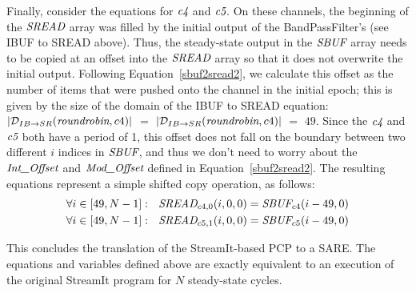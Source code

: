 Finally, consider the equations for $\mbox{\it c4}$ and $\mbox{\it c5}$.  On these
channels, the beginning of the $\mbox{\it SREAD}$ array was filled by the
initial output of the BandPassFilter's (see IBUF to SREAD above).
Thus, the steady-state output in the $\mbox{\it SBUF}$ array needs to be
copied at an offset into the $\mbox{\it SREAD}$ array so that it does not
overwrite the initial output.  Following Equation~\ref{sbuf2sread2},
we calculate this offset as the number of items that were pushed onto
the channel in the initial epoch; this is given by the size of the
domain of the IBUF to SREAD equation: $|{\cal D}_{IB \rightarrow
SR}(\mbox{\it roundrobin}, c4)|$ $=$ $|{\cal D}_{IB \rightarrow
SR}(\mbox{\it roundrobin}, c4)|$ $=$ $49$.  Since the $\mbox{\it c4}$ and
$\mbox{\it c5}$ both have a period of 1, this offset does not fall on the
boundary between two different $i$ indices in $\mbox{\it SBUF}$, and thus we
don't need to worry about the $\mbox{\it Int\_Offset}$ and
$\mbox{\it Mod\_Offset}$ defined in Equation~\ref{sbuf2sread2}.  The
resulting equations represent a simple shifted copy operation, as
follows:
\begin{align*}
\forall i \in [49,N-1]:~~\mbox{\it SREAD}_{{c4}, 0}(i,0,0) = \mbox{\it SBUF}_{c4}(i-49,0) \\
\forall i \in [49,N-1]:~~\mbox{\it SREAD}_{{c5}, 1}(i,0,0) = \mbox{\it SBUF}_{c5}(i-49,0)
\end{align*}

This concludes the translation of the StreamIt-based PCP to a SARE.
The equations and variables defined above are exactly equivalent to an
execution of the original StreamIt program for $N$ steady-state
cycles.
